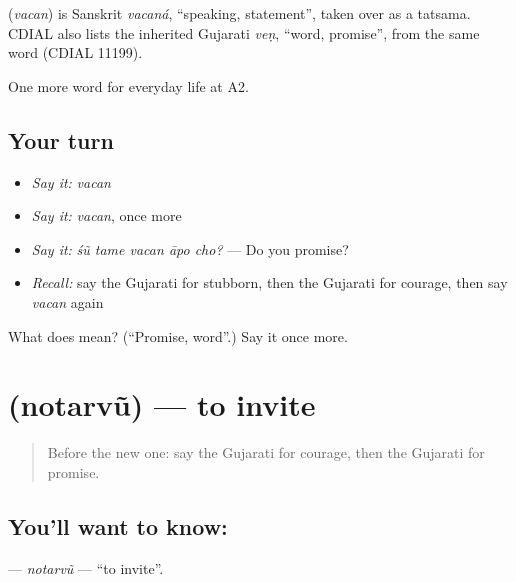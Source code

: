 \begin{cousinweb}
\textbf{} (\emph{vacan}) is Sanskrit \emph{vacaná}, \textquotedblleft{}speaking, statement\textquotedblright{}, taken over as a tatsama. CDIAL also lists the inherited Gujarati \emph{veṇ}, \textquotedblleft{}word, promise\textquotedblright{}, from the same word (CDIAL 11199).
\end{cousinweb}

\begin{grammarlens}[title={What you've built}]
One more word for everyday life at A2.
\end{grammarlens}

\subsection*{Your turn}
\begin{itemize}
\raggedright
  \item \emph{Say it:} \emph{vacan}
  \item \emph{Say it:} \emph{vacan}, once more
  \item \emph{Say it:} \emph{śũ tame vacan āpo cho?} — Do you promise?
  \item \emph{Recall:} say the Gujarati for stubborn, then the Gujarati for courage, then say \emph{vacan} again
\end{itemize}

\begin{tcolorbox}[breakable,colback=teal!4,colframe=teal!35!black,title={Before you move on}]
What does  mean? (\textquotedblleft{}Promise, word\textquotedblright{}.) Say it once more.
\end{tcolorbox}
\section[\texorpdfstring{\gu{નોતરવું} (notarvũ)}{નોતરવું (notarvũ)}]{ (notarvũ) — to invite}

\label{lesson:GU-C272-notarvu}



\begin{quote}
Before the new one: say the Gujarati for courage, then the Gujarati for promise.
\end{quote}

\subsection*{You'll want to know: }
\textbf{} — \emph{notarvũ} — \textquotedblleft{}to invite\textquotedblright{}.


